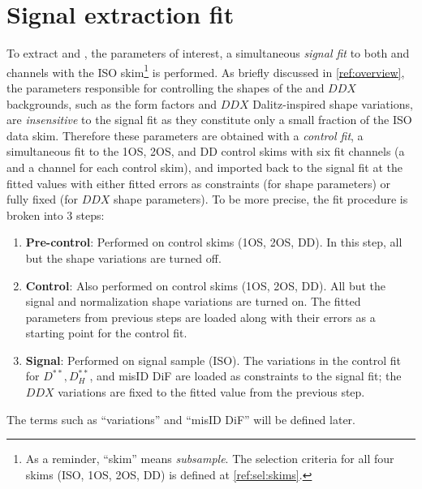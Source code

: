 \chapter{Signal extraction fit}
\label{ref:fit}

To extract \RD and \RDst, the parameters of interest,
a simultaneous \emph{signal fit}
to both \Dz and \Dstar channels with the ISO skim\footnote{
    As a reminder, ``skim'' means \emph{subsample}.
    The selection criteria for all four skims (ISO, 1OS, 2OS, DD) is defined at
    \cref{ref:sel:skims}.
} is performed.
As briefly discussed in \cref{ref:overview},
the parameters responsible for controlling the shapes of the \Dstst and
$DDX$ backgrounds,
such as the \Dstst form factors and $DDX$ Dalitz-inspired shape variations,
are \emph{insensitive} to the signal fit as they constitute only a small
fraction of the ISO data skim.
Therefore these parameters are obtained with a \emph{control fit},
a simultaneous fit to the 1OS, 2OS, and DD control skims with six fit channels
(a \Dz and a \Dstar channel for each control skim),
and imported back to the signal fit at the fitted values with either
fitted errors as constraints (for \Dstst shape parameters) or fully fixed
(for $DDX$ shape parameters).
To be more precise,
the fit procedure is broken into 3 steps:

\begin{enumerate}
    \item \textbf{Pre-control}:
        Performed on control skims (1OS, 2OS, DD).
        In this step, all but the \Kstar shape variations are turned off.
    \item \textbf{Control}:
        Also performed on control skims (1OS, 2OS, DD).
        All but the signal and normalization shape variations are turned on.
        The fitted parameters from previous steps are loaded along with their
        errors as a starting point for the control fit.
    \item \textbf{Signal}:
        Performed on signal sample (ISO).
        The variations in the control fit for $D^{**}, D_H^{**}$, and misID DiF
        are loaded as constraints to the signal fit;
        the $DDX$ variations are fixed to the fitted value from the previous
        step.
\end{enumerate}
The terms such as ``\Kstar variations'' and ``misID DiF'' will be defined later.

